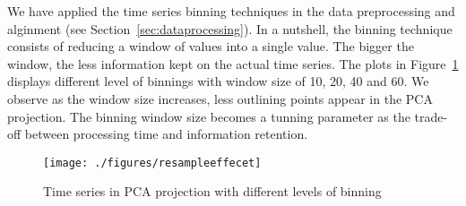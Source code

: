We have applied the time series binning techniques in the data preprocessing and alginment (see Section~\ref{sec:dataprocessing}). In a nutshell, the binning technique consists of reducing a window of values into a single value. The bigger the window, the less information kept on the actual time series. The plots in Figure~\ref{Fig:levelofbinning} displays different level of binnings with window size of 10, 20, 40 and 60. We observe as the window size increases, less outlining points appear in the PCA projection.  The binning window size becomes a tunning parameter as the trade-off between processing time and information retention. 

\begin{figure}
	\centering
	\texttt{[image: ./figures/resampleeffecet]}
	\caption{ Time series in PCA projection with different levels of binning}\label{Fig:levelofbinning}
\end{figure}
